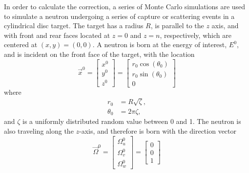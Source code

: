 In order to calculate the correction, a series of Monte Carlo simulations are used to simulate a neutron undergoing a series of capture or scattering events in a cylindrical disc target. The target has a radius $R$, is parallel to the $z$ axis, and with front and rear faces located at $z=0$ and $z=n$, respectively, which are centered at $(x,y)=(0,0)$. A neutron is born at the energy of interest, $E^0$, and is incident on the front face of the target, with the location
\begin{equation}
    \label{eq:incident-neutron-location}
    \overrightarrow{x}^0 = \begin{bmatrix}
        x^0 \\
        y^0 \\
        z^0
    \end{bmatrix} =
    \begin{bmatrix} 
        r_0\cos{\left( \theta_0 \right)} \\
        r_0\sin{\left( \theta_0 \right)} \\
        0
    \end{bmatrix}
\end{equation}
where
\begin{align*}
    r_0 &= R\sqrt{\zeta}, \\
    \theta_0 &= 2\pi\zeta,
\end{align*}
and $\zeta$ is a uniformly distributed random value between 0 and 1. The neutron is also traveling along the $z$-axis, and therefore is born with the direction vector
\begin{equation}
    \label{eq:incident-neutron-location}
    \overrightarrow{\Omega}^0 = \begin{bmatrix}
        \Omega^0_u \\
        \Omega^0_v \\
        \Omega^0_w
    \end{bmatrix} =
    \begin{bmatrix}
        0 \\
        0 \\
        1
    \end{bmatrix}
\end{equation}

